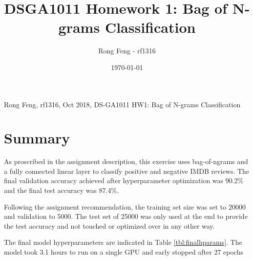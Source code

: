 \documentclass[a4paper,10pt]{article}
\title{DSGA1011 Homework 1: Bag of N-grams Classification}
\author{Rong Feng - rf1316}
\date{\printdayoff\today}
\begin{document}
Rong Feng, rf1316, Oct 2018, DS-GA1011 HW1: Bag of N-grams Classification

\section{Summary}
\par 
\justify
As proscribed in the assignment description, this exercise uses bag-of-ngrams and a fully connected linear layer to classify positive and negative IMDB reviews. The final validation accuracy achieved after hyperparameter optimization was 90.2\% and the final test accuracy was 87.4\%. 

\par
\justify
Following the assignment recommendation, the training set size was set to 20000 and validation to 5000. The test set of 25000 was only used at the end to provide the test accuracy and not touched or optimized over in any other way.

\par
\justify
The final model hyperparameters are indicated in Table \ref{tbl:finalhparams}. The model took 3.1 hours to run on a single GPU and early stopped after 27 epochs
\end{document}
